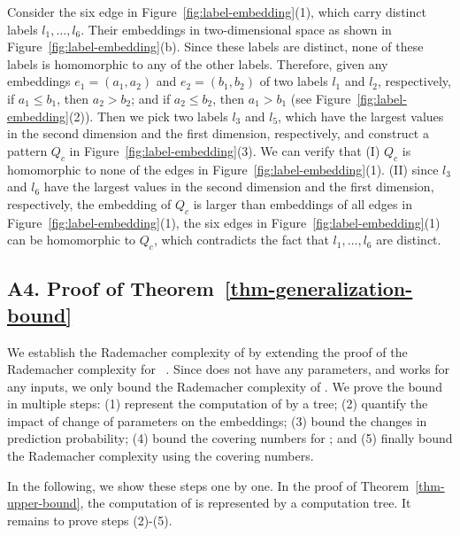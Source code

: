 
Consider the six edge in Figure~\ref{fig:label-embedding}(1),
which carry distinct labels
$l_1, \ldots, l_6$. Their embeddings in two-dimensional space
as shown in Figure~\ref{fig:label-embedding}(b).
Since these labels are distinct, 
none of these labels is homomorphic 
to any of the other labels.
Therefore, given any embeddings
$e_1 = (a_1, a_2)$ and 
$e_2 = (b_1, b_2)$ of two labels 
$l_1$ and $l_2$, respectively,
if $a_1\leq b_1$, then $a_2> b_2$;
and if $a_2\leq b_2$, then $a_1> b_1$ 
(see Figure~\ref{fig:label-embedding}(2)).
Then we pick two labels 
$l_3$ and $l_5$, which have the largest 
values in the second dimension and the first dimension,
respectively,
and construct a pattern $Q_c$ in 
Figure~\ref{fig:label-embedding}(3).
We can verify that 
(I) $Q_c$ is homomorphic
to none of the edges in Figure~\ref{fig:label-embedding}(1).
(II) %
since $l_3$ and $l_6$ have the largest 
values in the second dimension and the first dimension,
respectively,
the embedding of $Q_c$ is larger than embeddings
of all edges in Figure~\ref{fig:label-embedding}(1),
\ie the six edges in Figure~\ref{fig:label-embedding}(1)
can be homomorphic to $Q_c$,
which contradicts the fact that 
$l_1, \ldots, l_6$ are distinct.


\subsection*{A4. Proof of Theorem~\ref{thm-generalization-bound}}
We establish the Rademacher complexity  of \HFrame
by extending the proof of 
the Rademacher complexity for \GNNs~\cite{Gen-bound}.
Since \dual does not have any parameters, 
and works for any inputs, we only 
bound the Rademacher complexity of \HGIN.
We prove the bound in multiple steps:
(1) represent the computation of \HGIN
by a tree;
(2) quantify the impact of change 
of parameters on the embeddings;
(3) bound the changes in prediction probability;
(4) bound the covering numbers for \HGIN;
and (5) finally bound the Rademacher complexity
using the covering numbers.

In the following, we
show these steps one by one. 
In the proof of Theorem~\ref{thm-upper-bound}, 
the computation of \HGIN is represented by a 
computation tree.
It remains to prove steps (2)-(5).	
	
